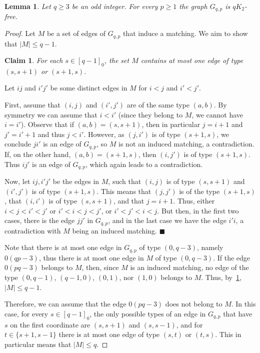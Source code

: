\documentclass[11pt,a4paper]{article}
\theoremstyle{mystyle}
\newtheorem{lemma}[theorem]{Lemma}
\newtheorem{claim}{Claim}[theorem]
\newenvironment{claimproof}{\noindent {\emph{Proof of Claim.}}}{\hfill$\blacksquare$\medskip}
\begin{document}
\begin{lemma}\label{lem:qk2-free}
Let $q \geq 3$ be an odd integer.
For every $p \geq 1$ the graph $G_{q,p}$ is $qK_2$-free.
\end{lemma}
\begin{proof}
Let $M$ be a set of edges of $G_{q,p}$ that induce a matching. We aim to show that $|M| \leq q-1$.
\begin{claim}\label{cla:one-edge}
    For each $s \in [q-1]_0$, the set $M$ contains at most one edge of type $(s,s+1)$ or $(s+1,s)$.
\end{claim}
\begin{claimproof}
    Let $ij$ and ${i'}{j'}$ be some distinct edges in $M$ for $i<j$ and $i'<j'$.
    
    First, assume that $(i,j)$ and $(i',j')$ are of the same type $(a,b)$.
    By symmetry we can assume that $i<i'$ (since they belong to $M$, we cannot have $i = i'$).
    Observe that if $(a,b)=(s,s+1)$, then in particular $j=i+1$ and $j'=i'+1$ and thus $j<i'$.
    However, as $(j,i')$ is of type $(s+1,s)$, we conclude $ji'$ is an edge of $G_{q,p}$,
    so $M$ is not an induced matching, a contradiction.
    If, on the other hand, $(a,b)=(s+1,s)$, then $(i,j')$ is of type $(s+1,s)$. Thus $ij'$ is an edge of $G_{q,p}$, which again leads to a contradiction. 
    
    Now, let $ij, i'j'$ be the edges in $M$, such that $(i,j)$ is of type $(s,s+1)$ and $(i',j')$ is of type $(s+1,s)$.
    This means that $(j,j')$ is of the type $(s+1,s)$, that $(i,i')$ is of type $(s,s+1)$, and that $j=i+1$.
    Thus, either $i<j<i'<j'$ or $i'<i<j<j'$, or $i'<j'<i<j$.
    But then, in the first two cases, there is the edge $jj'$ in $G_{q,p}$, and in the last case we have the edge $i'i$,
    a contradiction with $M$ being an induced  matching.
\end{claimproof}

Note that there is at most one edge in $G_{q,p}$ of type $(0,q-3)$, namely $0(qp-3)$, thus there is at most one edge in $M$ of type $(0,q-3)$. If the edge $0(pq-3)$ belongs to $M$, then, since $M$ is an induced matching, no edge of the type $(0,q-1)$, $(q-1,0)$, $(0,1)$, nor $(1,0)$ belongs to $M$. Thus, by~\ref{cla:one-edge}, $|M|\leq q-1$.

Therefore, we can assume that the edge $0(pq-3)$ does not belong to $M$. 
In this case, for every $s\in[q-1]_0$, the only possible types of an edge in $G_{q,p}$ that have $s$ on the first coordinate are $(s,s+1)$ and $(s,s-1)$, and for $t \in \{s+1,s-1\}$ there is at most one edge of type $(s,t)$ or $(t,s)$.
This in particular means that $|M| \leq q$.



\end{proof}
\end{document}

